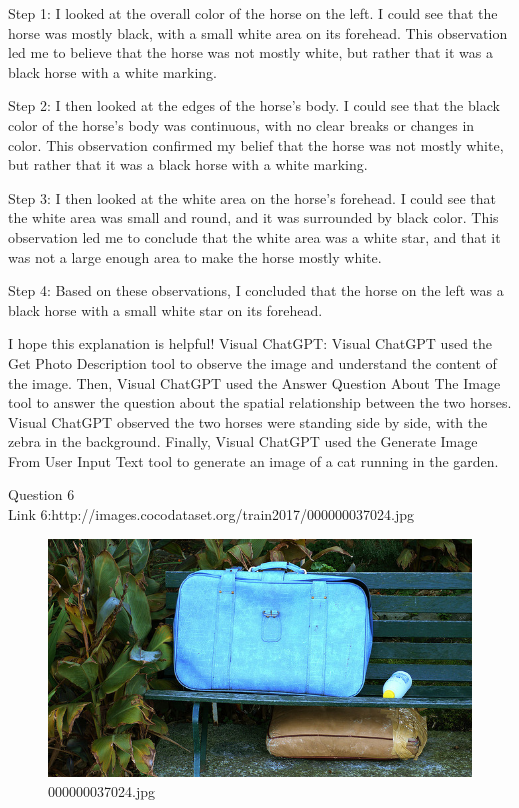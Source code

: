 \begin{enumerate}
        Step 1: I looked at the overall color of the horse on the left. I could see that the horse was mostly black, with a small white area on its forehead. This observation led me to believe that the horse was not mostly white, but rather that it was a black horse with a white marking.
        
        Step 2: I then looked at the edges of the horse's body. I could see that the black color of the horse's body was continuous, with no clear breaks or changes in color. This observation confirmed my belief that the horse was not mostly white, but rather that it was a black horse with a white marking.
        
        Step 3: I then looked at the white area on the horse's forehead. I could see that the white area was small and round, and it was surrounded by black color. This observation led me to conclude that the white area was a white star, and that it was not a large enough area to make the horse mostly white.
        
        Step 4: Based on these observations, I concluded that the horse on the left was a black horse with a small white star on its forehead.
        
        I hope this explanation is helpful!
        \subitem Visual ChatGPT: Visual ChatGPT used the Get Photo Description tool to observe the image and understand the content of the image. Then, Visual ChatGPT used the Answer Question About The Image tool to answer the question about the spatial relationship between the two horses. Visual ChatGPT observed the two horses were standing side by side, with the zebra in the background. Finally, Visual ChatGPT used the Generate Image From User Input Text tool to generate an image of a cat running in the garden.
    \end{enumerate}
Question 6\\
Link 6:http://images.cocodataset.org/train2017/000000037024.jpg
    \begin{figure}[h]
        \centering
        \includegraphics[width=0.8\linewidth]{../image set/easy/000000037024.jpg}
        \caption{000000037024.jpg}
    \end{figure}
